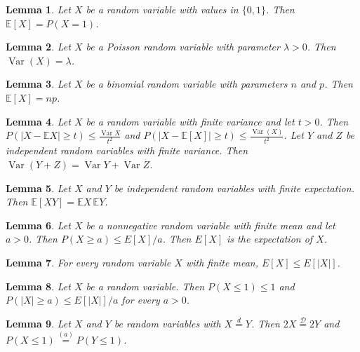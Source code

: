 \documentclass{article}
\newtheorem{lemma}{Lemma}
\begin{document}
\begin{lemma}\label{values-in}
Let $X$ be a random variable with values in $\{0,1\}$. Then $\mathbb{E}[X]=P(X=1)$.
\end{lemma}

\begin{lemma}\label{poisson-variable}
Let $X$ be a Poisson random variable with parameter $\lambda>0$. Then $\operatorname{Var}(X)=\lambda$.
\end{lemma}

\begin{lemma}\label{binomial-variable}
Let $X$ be a binomial random variable with parameters $n$ and $p$. Then $\mathbb{E}[X]=np$.
\end{lemma}

\begin{lemma}\label{chebyshev}
Let $X$ be a random variable with finite variance and let $t>0$. Then $P(|X-\mathbb{E}X|\ge t)\le\frac{\operatorname{Var}X}{t^2}$ and $P(|X-\mathbb{E}[X]|\ge t)\le\frac{\operatorname{Var}(X)}{t^2}$. Let $Y$ and $Z$ be independent random variables with finite variance. Then $\operatorname{Var}(Y+Z)=\operatorname{Var}Y+\operatorname{Var}Z$.
\end{lemma}

\begin{lemma}\label{independent-product}
Let $X$ and $Y$ be independent random variables with finite expectation. Then $\mathbb{E}[XY]=\mathbb{E}X\,\mathbb{E}Y$.
\end{lemma}

\begin{lemma}\label{plain-expectation}
Let $X$ be a nonnegative random variable with finite mean and let $a>0$. Then $P(X\ge a)\le E[X]/a$. Then $E[X]$ is the expectation of $X$.
\end{lemma}

\begin{lemma}\label{binder-words}
For every random variable $X$ with finite mean, $E[X]\le E[|X|]$.
\end{lemma}

\begin{lemma}\label{one-random-variable}
Let $X$ be a random variable. Then $P(X\le 1)\le 1$ and $P(|X|\ge a)\le E[|X|]/a$ for every $a>0$.
\end{lemma}

\begin{lemma}\label{equal-in-distribution}
Let $X$ and $Y$ be random variables with $X\stackrel{d}{=}Y$. Then $2X\overset{\mathcal{D}}{=}2Y$ and $P(X\le 1)\stackrel{(a)}{=}P(Y\le 1)$.
\end{lemma}
\end{document}
